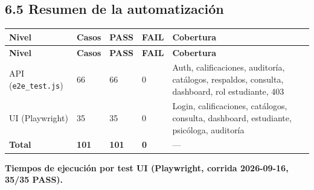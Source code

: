 \documentclass[11pt,a4paper]{article}
\begin{document}
\subsection*{6.5 Resumen de la automatización}


{\small
\begin{longtable}{|p{}|p{}|p{}|p{}|p{}|}
\rowcolor{UTECblue}\color{white}\bfseries Nivel & \color{white}\bfseries Casos & \color{white}\bfseries PASS & \color{white}\bfseries FAIL & \color{white}\bfseries Cobertura \\ \hline
\endfirsthead
\rowcolor{UTECblue}\color{white}\bfseries Nivel & \color{white}\bfseries Casos & \color{white}\bfseries PASS & \color{white}\bfseries FAIL & \color{white}\bfseries Cobertura \\ \hline
\endhead
API (\texttt{e2e\_test.js}) & 66 & 66 & 0 & Auth, calificaciones, auditoría, catálogos, respaldos, consulta, dashboard, rol estudiante, 403 \\ \hline
UI (Playwright) & 35 & 35 & 0 & Login, calificaciones, catálogos, consulta, dashboard, estudiante, psicóloga, auditoría \\ \hline
\textbf{Total} & \textbf{101} & \textbf{101} & \textbf{0} & --- \\ \hline
\end{longtable}}


\textbf{Tiempos de ejecución por test UI (Playwright, corrida 2026-09-16, 35/35 PASS).}
\end{document}
